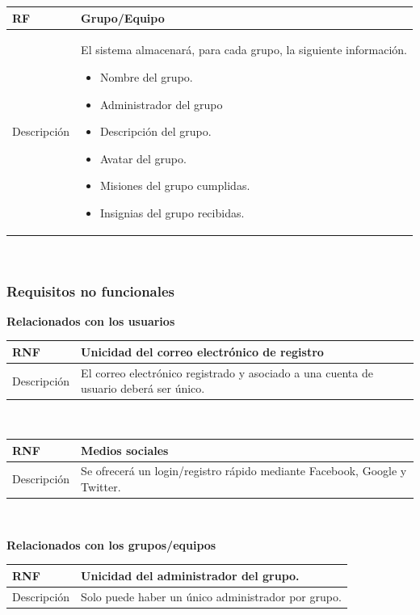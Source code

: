 \documentclass[twoside]{report}
\newcommand\addrow[2]{#1 &#2\\ }
\newcommand\addheading[2]{#1 &#2\\ \hline}
\newcommand\tabularhead{\begin{tabular}{lp{0.7\textwidth}}
\hline
}
\newenvironment{req}{\tabularhead}
{\hline\end{tabular}}
\begin{document}
\begin{req}
	\addheading{\textbf{RF\arabic{functionalRequirements}}}{Grupo/Equipo}
	\addrow{Descripción}{
	El sistema almacenará, para cada grupo, la siguiente información.
	\begin{multicols}{2}
	\begin{itemize}
		\item Nombre del grupo.
		\item Administrador del grupo
		\item Descripción del grupo.
		\item Avatar del grupo.
		\item Misiones del grupo cumplidas.
		\item Insignias del grupo recibidas.
	\end{itemize}
	\end{multicols}
	}
\end{req}\\

\subsubsection{Requisitos no funcionales}



\textbf{Relacionados con los usuarios}\\

\begin{req}
	\addheading{\textbf{RNF\arabic{nonFunctionalRequirements}}}{Unicidad del correo electrónico de registro}
	\addrow{Descripción}{El correo electrónico registrado y asociado a una cuenta de usuario deberá ser único.}
\end{req}\\

\begin{req}
	\addheading{\textbf{RNF\arabic{nonFunctionalRequirements}}}{Medios sociales}
	\addrow{Descripción}{Se ofrecerá un login/registro rápido mediante Facebook, Google y Twitter.}
\end{req}\\

\textbf{Relacionados con los grupos/equipos}\\

\begin{req}
	\addheading{\textbf{RNF\arabic{nonFunctionalRequirements}}}{Unicidad del administrador del grupo.}
	\addrow{Descripción}{Solo puede haber un único administrador por grupo.}
\end{req}\\
\end{document}
